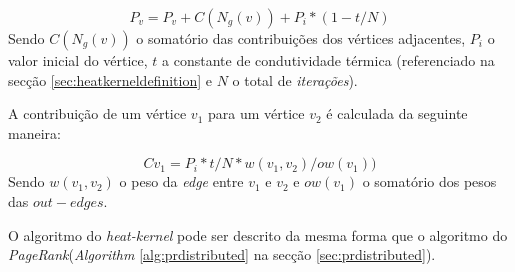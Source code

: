   \begin{center}
    \begin{equation}
      \label{eq:heatkerneldistributedrank}
       P_v = P_v + C(N_g(v)) + P_i * (1 - t/N)
    \end{equation}
    Sendo $C(N_g(v))$ o somatório das contribuições dos vértices adjacentes, $P_i$  o valor inicial do vértice, $t$ a constante de condutividade térmica (referenciado na secção \ref{sec:heatkerneldefinition} e $N$ o total de \textit{iterações}).
  \end{center}    
  
  A contribuição de um vértice $v_1$ para um vértice $v_2$ é calculada da seguinte maneira:
  
  \begin{center}
    \begin{equation}
      \label{eq:heatkerneldistributedcontribution}
       Cv_1=P_i * t / N * w(v_1,v_2)/ow(v_1))
    \end{equation}
    Sendo $w(v_1,v_2)$ o peso da \textit{edge} entre $v_1$ e $v_2$ e $ow(v_1)$ o somatório dos pesos das $out-edges$.
  \end{center}  
  
  O algoritmo do \textit{heat-kernel} pode ser descrito da mesma forma que o algoritmo do \textit{PageRank}(\textit{Algorithm} \ref{alg:prdistributed} na secção \ref{sec:prdistributed}).
  